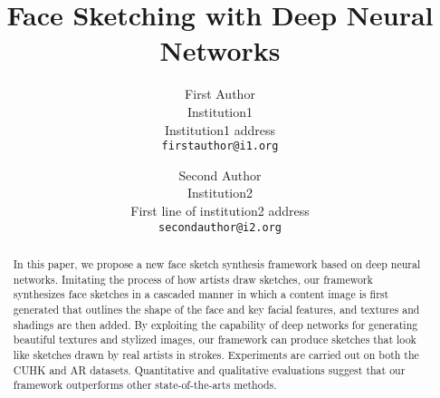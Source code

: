 \documentclass[10pt,twocolumn,letterpaper]{article}
\begin{document}
\title{Face Sketching with Deep Neural Networks}

\author{First Author\\
Institution1\\
Institution1 address\\
{\tt\small firstauthor@i1.org}
\and
Second Author\\
Institution2\\
First line of institution2 address\\
{\tt\small secondauthor@i2.org}
}

\maketitle

\begin{abstract}

In this paper, we propose a new face sketch synthesis framework based on deep neural networks. Imitating the process of how artists draw sketches, our framework synthesizes face sketches in a cascaded manner in which a content image is first generated that outlines the shape of the face and key facial features, and textures and shadings are then added. By exploiting the capability of deep networks for generating beautiful textures and stylized images, our framework can produce sketches that look like sketches drawn by real artists in strokes. Experiments are carried out on both the CUHK and AR datasets. Quantitative and qualitative evaluations suggest that our framework outperforms other state-of-the-arts methods.
\end{abstract}
\end{document}
